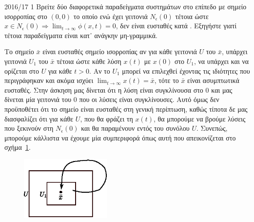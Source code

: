 \begin{exercise}{2016/17 1}
    Βρείτε δύο διαφορετικά παραδείγματα συστημάτων στο επίπεδο με σημείο
    ισορροπίας στο \( (0, 0) \) το οποίο ενώ έχει γειτονιά \( N_{\epsilon}(0) \)
    τέτοια ώστε \( x \in N_{\epsilon}(0) \Rightarrow \lim_{t \to \infty} \phi(x,
    t) = 0 \), δεν είναι ευσταθές κατά . Εξηγήστε γιατί τέτοια
    παραδείγματα είναι κατ᾽ ανάγκην μη-γραμμικά.
\end{exercise}
\begin{solution}
    Το σημείο \( \bar{x} \) είναι ευσταθές σημείο ισορροπίας αν για κάθε
    γειτονιά \( U \) του \( \bar{x} \), υπάρχει γειτονιά \( U_1 \) του
    \( \bar{x} \) τέτοια ώστε κάθε λύση \( x(t) \) με \( x(0) \) στο \( U_1 \),
    να υπάρχει και να ορίζεται στο \( U \) για κάθε \( t > 0 \). Αν το \( U_1 \)
    μπορεί να επιλεχθεί έχοντας τις ιδιότητες που περιγράφηκαν και ακόμα ισχύει
    \( \lim_{t \to \infty} x(t) = \bar{x} \), τότε το \( \bar{x} \) είναι
    ασυμπτωτικά ευσταθές. Στην άσκηση μας δίνεται ότι η λύση είναι
    συγκλίνουσα στο \( 0 \) και μας δίνεται μία γειτονιά του \( 0 \) που
    οι λύσεις είναι συγκλίνουσες. Αυτό όμως δεν προϋποθέτει ότι το σημείο
    είναι ευσταθές στη γενική περίπτωση, καθώς τίποτα δε μας διασφαλίζει ότι
    για κάθε \( U \), που θα φράζει τη \( x(t) \), θα μπορούμε να βρούμε λύσεις
    που ξεκινούν στη \( N_{\epsilon}(0) \) και θα παραμένουν εντός του συνόλου
    \( U \). Συνεπώς, μπορούμε κάλλιστα να έχουμε μία συμπεριφορά όπως
    αυτή που απεικονίζεται στο σχήμα~\ref{fig:ex1_unstable_convergent}.
    \begin{figure}[h]
        \centering
        \includegraphics[width=0.4\textwidth]{figures/ex1_unstable_convergent.eps}
        \caption{}
        \label{fig:ex1_unstable_convergent}
    \end{figure}


\end{solution}
